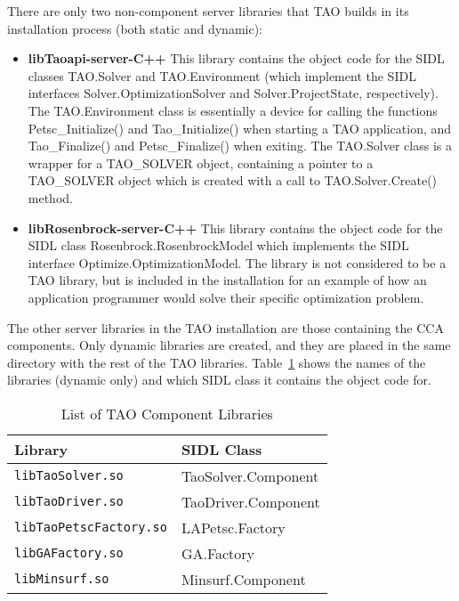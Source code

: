 \documentclass[doublespacing,12pt]{article}
\begin{document}
There are only two non-component server libraries that TAO builds in its
installation process (both static and dynamic):
\begin{itemize}
\item \textbf{libTaoapi-server-C++} This library contains the object code
for the SIDL classes \textsf{TAO.Solver} and \textsf{TAO.En\-vi\-ron\-ment} 
(which implement the
SIDL interfaces \textsf{Sol\-ver.Op\-ti\-mi\-za\-tion\-Sol\-ver} and 
\textsf{Solver.ProjectState}, 
respectively).  The TAO.En\-vi\-ron\-ment class is essentially a device for
calling the functions \textsf{Petsc\_Initialize()} and 
\textsf{Tao\_Initialize()} when
starting a TAO application, and \textsf{Tao\_Finalize()} and 
\textsf{Petsc\_Finalize()} when
exiting.
The \textsf{TAO.Solver} class is a wrapper for a TAO\_SOLVER object,
containing a
pointer to a TAO\_SOLVER object which is created with a call to
\textsf{TAO.Solver.Create()} method.

\item \textbf{libRosenbrock-server-C++} This library contains the object code
for the SIDL class \textsf{Rosen\-brock.Rosen\-brockModel} which
implements the SIDL interface 
\textsf{Optimize.Op\-ti\-mi\-za\-tion\-Mod\-el}.  The library is not considered to be
a TAO library, but is included in the installation for an example of how
an application programmer would solve their specific optimization problem.
\end{itemize}

The other server libraries in the TAO installation are those containing the
CCA components.  Only dynamic libraries are created, and they are placed in 
the same directory with the rest of the TAO libraries.  
Table~\ref{table:componentlibs} shows the names of the libraries (dynamic only)
and which SIDL class it contains the object code for.
\begin{table}\label{table:componentlibs}
\caption{List of TAO Component Libraries}
\begin{center}
\begin{tabular}{ l | l  }
Library & SIDL Class  \\
\hline
\texttt{libTaoSolver.so} & \textsf{TaoSolver.Component} \\
\texttt{libTaoDriver.so} & \textsf{TaoDriver.Component} \\ 
\texttt{libTaoPetscFactory.so} & \textsf{LAPetsc.Factory} \\
\texttt{libGAFactory.so} & \textsf{GA.Factory} \\
\texttt{libMinsurf.so} & \textsf{Minsurf.Component} \\
\end{tabular}
\end{center}
\end{table}
\end{document}
